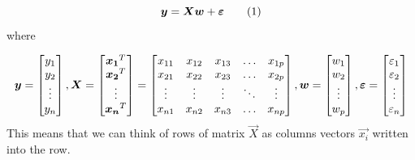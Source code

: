 
\begin{equation}
    \vec{y} = \vec{X}\vec{w} + \vec{\varepsilon}    \numberthis
\end{equation} where

\[ 
\vec{y} = \begin{bmatrix}
    y_{1} \\
    y_{2} \\
    \vdots \\
    y_{n}
  \end{bmatrix}\\,
 \vec{X} = \begin{bmatrix}
    \vec{x_1}^T \\
    \vec{x_2}^T \\
    \vdots \\
    \vec{x_n}^T
\end{bmatrix}
=
\begin{bmatrix}
    x_{11} & x_{12} & x_{13} & \dots  & x_{1p} \\
    x_{21} & x_{22} & x_{23} & \dots  & x_{2p} \\
    \vdots & \vdots & \vdots & \ddots & \vdots \\
    x_{n1} & x_{n2} & x_{n3} & \dots  & x_{np}
\end{bmatrix}\\,
\vec{w} = \begin{bmatrix}
    w_{1} \\
    w_{2} \\
    \vdots \\
    w_{p}
  \end{bmatrix}\\,
  \vec{\varepsilon} = \begin{bmatrix}
    \varepsilon_{1} \\
    \varepsilon_{2} \\
    \vdots \\
    \varepsilon_{n}
  \end{bmatrix}
\]
This means that we can think of rows of matrix $\vec{X}$ as columns vectors $\vec{x_i}$ written into the row.

